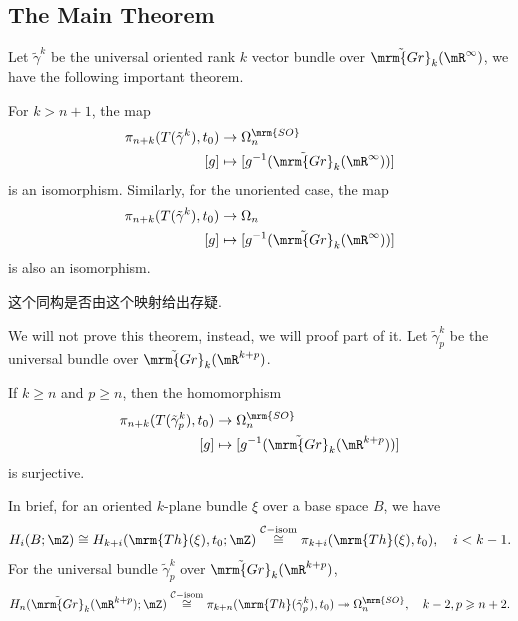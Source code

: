 \subsection{The Main Theorem}
Let $\tilde{\gamma}^k$ be the universal oriented rank 
$k$ vector bundle over $\tilde{\mrm{Gr}}_k(\mR^\infty)$, 
we have the following important theorem.
\begin{theorem}
    For $k>n+1$, the map
    \begin{align*}
        \pi_{n+k}(T(\tilde{\gamma}^k),t_0) &\to \Omega^{\mrm{SO}}_{n} \\
        [g] &\mapsto [g^{-1}(\tilde{\mrm{Gr}}_k(\mR^\infty))]
    \end{align*}
    is an isomorphism. Similarly, for the unoriented case,
    the map
    \begin{align*}
        \pi_{n+k}(T(\tilde{\gamma}^k),t_0) &\to \Omega_{n} \\
        [g] &\mapsto [g^{-1}(\tilde{\mrm{Gr}}_k(\mR^\infty))]
    \end{align*}
    is also an isomorphism.
\end{theorem}
\begin{remark}
    这个同构是否由这个映射给出存疑.
\end{remark}
We  will not prove this theorem, instead, we will proof part of it.
Let $\tilde{\gamma}^k_p$ be the universal bundle over $\tilde{\mrm{Gr}}_k(\mR^{k+p})$.
\begin{lemma}
    If $k\geq n$ and $p\geq n$, then the homomorphism
    \begin{align*}
        \pi_{n+k}(T(\tilde{\gamma}^k_p),t_0) &\to \Omega^{\mrm{SO}}_{n} \\
        [g] &\mapsto [g^{-1}(\tilde{\mrm{Gr}}_k(\mR^{k+p}))]
    \end{align*}
    is surjective.
\end{lemma}

In brief, for an oriented $k$-plane bundle $\xi$ over a base space $B$, we have 
\begin{equation*}
    H_i(B;\mZ)\cong H_{k+i}(\mrm{Th}(\xi),t_0;\mZ) \overset{\mathcal{C}-\text{isom}}{\cong} \pi_{k+i}(\mrm{Th}(\xi),t_0), \quad i<k-1.
\end{equation*}
For the universal bundle $\tilde{\gamma}^k_p$ over $\tilde{\mrm{Gr}}_k(\mR^{k+p})$, 
\begin{equation*}
    H_n(\tilde{\mrm{Gr}}_k(\mR^{k+p});\mZ) \overset{\mathcal{C}-\text{isom}}{\cong} 
    \pi_{k+n}(\mrm{Th}(\tilde{\gamma}^k_p),t_0) \twoheadrightarrow \Omega^{\mrm{SO}}_{n}, \quad k-2,p\geqslant n+2.
\end{equation*}